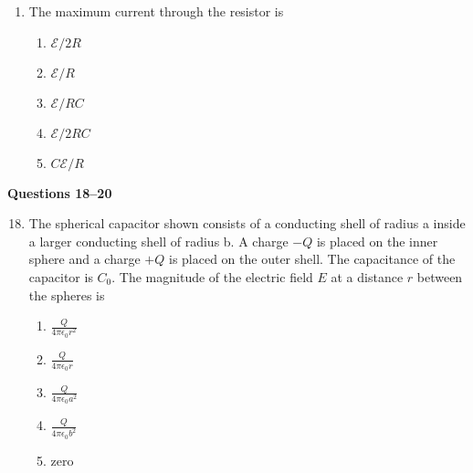 \documentclass[11pt]{article}
\begin{document}
\begin{multicols}{2}
\begin{enumerate}[leftmargin=18pt]
  \item The maximum current through the resistor is
    \begin{enumerate}[noitemsep,topsep=0pt,leftmargin=18pt,label=(\Alph*)]
    \item $\mathcal{E}/2R$
    \item $\mathcal{E}/R$
    \item $\mathcal{E}/RC$
    \item $\mathcal{E}/2RC$
    \item $C\mathcal{E}/R$
    \end{enumerate}
  \end{enumerate}
  \columnbreak
  \textbf{Questions 18--20}
  \begin{enumerate}[leftmargin=18pt]
    \setcounter{enumi}{17}
  \item The spherical capacitor shown consists of a conducting shell of radius a
    inside a larger conducting shell of radius b. A charge $−Q$ is placed on the
    inner sphere and a charge $+Q$ is placed on the outer shell. The
    capacitance of the capacitor is $C_0$. The magnitude of the electric field
    $E$ at a distance $r$ between the spheres is
    \begin{center}
    \end{center}
    \begin{enumerate}[noitemsep,topsep=0pt,leftmargin=18pt,label=(\Alph*)]    
    \item $\displaystyle\frac{Q}{4\pi\epsilon_0r^2}$
    \item $\displaystyle\frac{Q}{4\pi\epsilon_0r}$
    \item $\displaystyle\frac{Q}{4\pi\epsilon_0a^2}$
    \item $\displaystyle\frac{Q}{4\pi\epsilon_0b^2}$
    \item zero
    \end{enumerate}


\end{enumerate}
\end{multicols}
\end{document}
